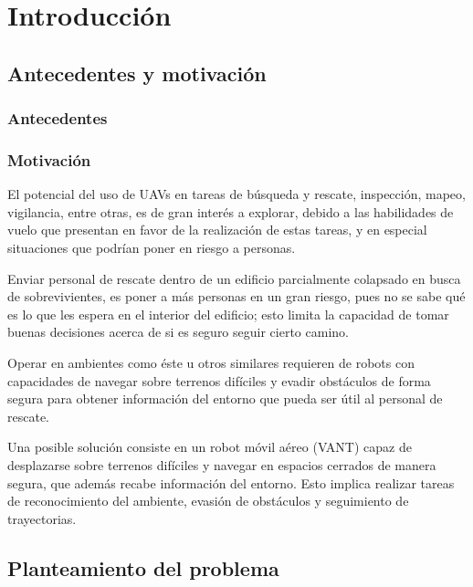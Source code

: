 \chapter{Introducción}

\lipsum[2-4]

\section{Antecedentes y motivación} 

\subsection*{Antecedentes}
\lipsum[1]

\subsection*{Motivación}

El potencial del uso de UAVs en tareas de búsqueda y rescate, inspección, mapeo, vigilancia, entre otras, es de gran interés a explorar, debido a las habilidades de vuelo que presentan en favor de la realización de estas tareas, y en especial situaciones que podrían poner en riesgo a personas.

Enviar personal de rescate dentro de un edificio parcialmente colapsado en busca de sobrevivientes, es poner a más personas en un gran riesgo, pues no se sabe qué es lo que les espera en el interior del edificio; esto limita la capacidad de tomar buenas decisiones acerca de si es seguro seguir cierto camino.

Operar en ambientes como éste u otros similares requieren de robots con capacidades de navegar sobre terrenos difíciles y evadir obstáculos de forma segura para obtener información del entorno que pueda ser útil al personal de rescate.

Una posible solución consiste en un robot móvil aéreo (VANT) capaz de desplazarse sobre terrenos difíciles y navegar en espacios cerrados de manera segura, que además recabe información del entorno. Esto implica realizar tareas de reconocimiento del ambiente, evasión de obstáculos y seguimiento de trayectorias.

\section{Planteamiento del problema} 

